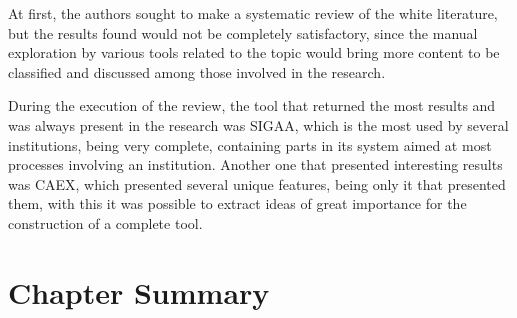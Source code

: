 At first, the authors sought to make a systematic review of the white literature, but the results found would not be completely satisfactory, since the manual exploration by various tools related to the topic would bring more content to be classified and discussed among those involved in the research.


During the execution of the review, the tool that returned the most results and was always present in the research was \ac{SIGAA}, which is the most used by several institutions, being very complete, containing parts in its system aimed at most processes involving an institution.
Another one that presented interesting results was \ac{CAEX}, which presented several unique features, being only it that presented them, with this it was possible to extract ideas of great importance for the construction of a complete tool.
\section{Chapter Summary}\label{sec:3.4}

